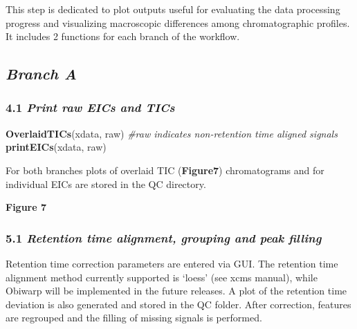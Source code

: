 \documentclass[
]{article}
\newenvironment{Shaded}{\begin{snugshade}}{\end{snugshade}}
\newcommand{\CommentTok}[1]{\textcolor[rgb]{0.56,0.35,0.01}{\textit{#1}}}
\newcommand{\KeywordTok}[1]{\textcolor[rgb]{0.13,0.29,0.53}{\textbf{#1}}}
\newcommand{\NormalTok}[1]{#1}
\newcommand{\StringTok}[1]{\textcolor[rgb]{0.31,0.60,0.02}{#1}}
\begin{document}
This step is dedicated to plot outputs useful for evaluating the data
processing progress and visualizing macroscopic differences among
chromatographic profiles. It includes 2 functions for each branch of the
workflow.

\hypertarget{branch-a}{%
\subsection{\texorpdfstring{\emph{Branch A}}{Branch A}}\label{branch-a}}

\hypertarget{print-raw-eics-and-tics}{%
\subsubsection{\texorpdfstring{4.1 \emph{Print raw EICs and
TICs}}{4.1 Print raw EICs and TICs}}\label{print-raw-eics-and-tics}}

\begin{Shaded}
\begin{Highlighting}[]
\KeywordTok{OverlaidTICs}\NormalTok{(xdata, }\StringTok{\textquotesingle{}raw\textquotesingle{}}\NormalTok{) }\CommentTok{\#raw indicates non{-}retention time aligned signals}
\KeywordTok{printEICs}\NormalTok{(xdata, }\StringTok{\textquotesingle{}raw\textquotesingle{}}\NormalTok{)}
\end{Highlighting}
\end{Shaded}

For both branches plots of overlaid TIC (\textbf{Figure7}) chromatograms
and for individual EICs are stored in the QC directory.

\textbf{Figure 7}

\hypertarget{retention-time-alignment-grouping-and-peak-filling}{%
\subsubsection{\texorpdfstring{5.1 \emph{Retention time alignment,
grouping and peak
filling}}{5.1 Retention time alignment, grouping and peak filling}}\label{retention-time-alignment-grouping-and-peak-filling}}

Retention time correction parameters are entered via GUI. The retention
time alignment method currently supported is `loess' (see xcms manual),
while Obiwarp will be implemented in the future releases. A plot of the
retention time deviation is also generated and stored in the QC folder.
After correction, features are regrouped and the filling of missing
signals is performed.
\end{document}
